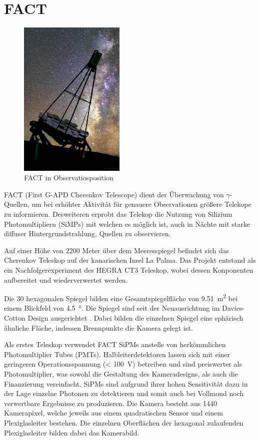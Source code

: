 \chapter{FACT}
\begin{figure}
  \includegraphics[width=0.45\textwidth]{./images/FACT.jpg}
  \caption{FACT in Observatiosposition \cite{factpic}}
  \label{fig:observ}
\end{figure}
FACT (First G-APD Cherenkov Telescope) dient der Überwachung von $\gamma$-Quellen, um bei erhöhter Aktivität für genauere Observationen größere Telekope zu informieren. 
Desweiteren erprobt das Telekop die Nutzung von Silizium Photomultipliern (SiMPs) mit welchen es möglich ist, auch in Nächte mit starke diffuser Hintergrundstrahlung, Quellen zu observieren. 

Auf einer Höhe von 2200 Meter über dem Meeresspiegel befindet sich das Cherenkov Teleskop auf der kanarischen Insel La Palma. 
Das Projekt entstand als ein Nachfolgerexperiment des HEGRA CT3 Teleskop, wobei dessen Konponenten aufbereitet und wiederverwertet werden.

Die 30 hexagonalen Spiegel bilden eine Gesamtspiegelfläche von \SI{9.51}{\meter\squared} bei einem Blickfeld von \SI{4.5}{\degree}. 
Die Spiegel sind seit der Neuausrichtung im Davies-Cotton Design ausgerichtet \cite{design-detec}.
Dabei bilden die einzelnen Spiegel eine sphärisch ähnliche Fläche, indessen Brennpunkte die Kamera gelegt ist.

Als erstes Teleskop verwendet FACT SiPMs anstelle von herkömmlichen Photomultiplier Tubes (PMTs). 
Halbleiterdetektoren lassen sich mit einer geringeren Operationsspannung (< \SI{100}{\volt}) betreiben und sind preiswerter als Photomultiplier, was sowohl die Gestaltung des Kameradesigns, als auch die Finanzierung vereinfacht. 
SiPMs sind aufgrund ihrer hohen Sensitivität dazu in der Lage einzelne Photonen zu detektieren und somit auch bei Vollmond noch verwertbare Ergebnisse zu produzieren.
Die Kamera besteht aus 1440 Kamerapixel, welche jeweils aus einem quadratischen Sensor und einem Plexiglasleiter bestehen. Die einzelnen Oberflächen der hexagonal zulaufenden Plexiglasleiter bilden dabei das Kamerabild.

